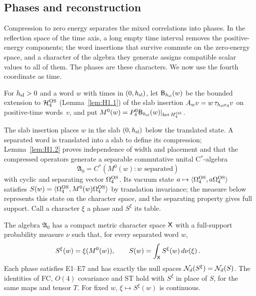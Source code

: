 \subsection{Phases and reconstruction}\label{sec:phases}

Compression to zero energy separates the mixed correlations into phases. In the reflection space of the time axis, a long empty time interval removes the positive-energy components; the word insertions that survive commute on the zero-energy space, and a character of the algebra they generate assigns compatible scalar values to all of them. The phases are these characters. We now use the fourth coordinate as time.

\begin{definition}[Compression]\label{def:compression}
For $h_{\rm sl}>0$ and a word $w$ with times in $(0,h_{\rm sl})$, let $\mathsf B_{h_{\rm sl}}(w)$ be the bounded extension to $\mathcal H_4^{\rm OS}$ (Lemma~\ref{lem:H1.1}) of the slab insertion $A_wv=w\,\tau_{h_{\rm sl}e_4}v$ on positive-time words~$v$, and put $M^0(w)=P^0_4\mathsf B_{h_{\rm sl}}(w)|_{\ker H_4^{\rm OS}}$.
\end{definition}

The slab insertion places $w$ in the slab $(0,h_{\rm sl})$ below the translated state. A separated word is translated into a slab to define its compression; Lemma~\ref{lem:H1.2} proves independence of width and placement and that the compressed operators generate a separable commutative unital C$^*$-algebra
\begin{equation*}
\mathfrak A_0=C^*(M^0(w):w\text{ separated})
\end{equation*}
with cyclic and separating vector $\Omega_4^{\rm OS}$. Its vacuum state $a\mapsto\langle\Omega_4^{\rm OS},a\Omega_4^{\rm OS}\rangle$ satisfies $S(w)=\langle\Omega_4^{\rm OS},M^0(w)\Omega_4^{\rm OS}\rangle$ by translation invariance; the measure below represents this state on the character space, and the separating property gives full support. Call a character $\xi$ a phase and $S^\xi$ its table.

\begin{theorem}\label{prop:PH}
The algebra $\mathfrak A_0$ has a compact metric character space $\mathsf{X}$ with a full-support probability measure $\nu$ such that, for every separated word $w$,
\begin{equation*}
S^\xi(w)=\xi(M^0(w)),\qquad S(w)=\int_{\mathsf{X}}S^\xi(w)\,d\nu(\xi)\,.
\end{equation*}
Each phase satisfies E1--E7 and has exactly the null spaces $\mathcal{N}_{d}(S^\xi)=\mathcal{N}_{d}(S)$. The identities of FC, $O(4)$ covariance and ST hold with $S^\xi$ in place of $S$, for the same maps and tensor $T$. For fixed $w$, $\xi\mapsto S^\xi(w)$ is continuous.
\end{theorem}

